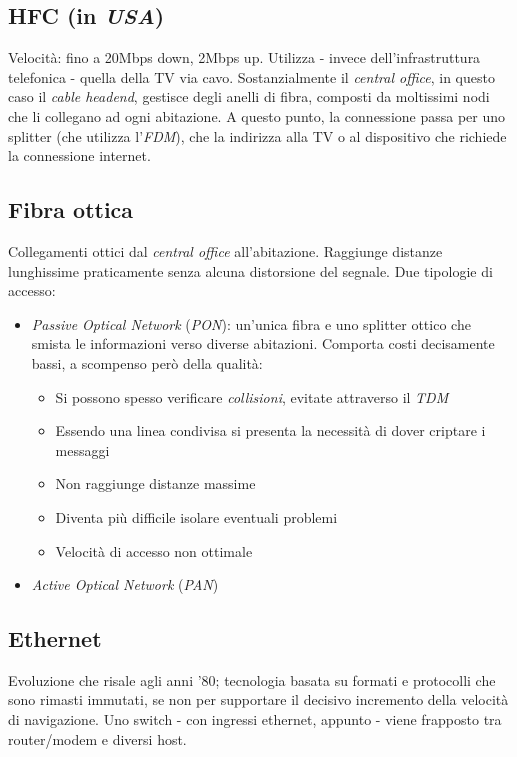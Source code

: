 \subsection{HFC (in \textit{USA})}
Velocità: fino a 20Mbps down, 2Mbps up.
Utilizza - invece dell'infrastruttura telefonica - quella della TV via cavo.
Sostanzialmente il \textit{central office}, in questo caso il \textit{cable headend}, gestisce degli anelli di fibra, composti da moltissimi nodi che li collegano ad ogni abitazione. A questo punto, la connessione passa per uno splitter (che utilizza l'\textit{FDM}), che la indirizza alla TV o al dispositivo che richiede la connessione internet. 

\subsection{Fibra ottica}
Collegamenti ottici dal \textit{central office} all'abitazione. Raggiunge distanze lunghissime praticamente senza alcuna distorsione del segnale.
Due tipologie di accesso:
\begin{itemize}
	\item \textit{Passive Optical Network} (\textit{PON}): un'unica fibra e uno splitter ottico che smista le informazioni verso diverse abitazioni. Comporta costi decisamente bassi, a scompenso però della qualità:
	\begin{itemize}
		\item Si possono spesso verificare \textit{collisioni}, evitate attraverso il \textit{TDM}
		\item Essendo una linea condivisa si presenta la necessità di dover criptare i messaggi
		\item Non raggiunge distanze massime
		\item Diventa più difficile isolare eventuali problemi
		\item Velocità di accesso non ottimale
	\end{itemize}
	\item \textit{Active Optical Network} (\textit{PAN})
\end{itemize}

\subsection{Ethernet}
Evoluzione che risale agli anni '80; tecnologia basata su formati e protocolli che sono rimasti immutati, se non per supportare il decisivo incremento della velocità di navigazione.
Uno switch - con ingressi ethernet, appunto - viene frapposto tra router/modem e diversi host.

